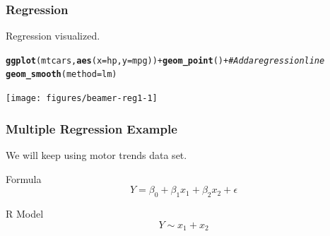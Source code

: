 \documentclass{beamer}\usepackage[]{graphicx}\usepackage[]{color}
\makeatletter
\newcommand{\hlcom}[1]{\textcolor[rgb]{0.678,0.584,0.686}{\textit{#1}}}%
\newcommand{\hlopt}[1]{\textcolor[rgb]{0,0,0}{#1}}%
\newcommand{\hlstd}[1]{\textcolor[rgb]{0.345,0.345,0.345}{#1}}%
\newcommand{\hlkwc}[1]{\textcolor[rgb]{0.333,0.667,0.333}{#1}}%
\newcommand{\hlkwd}[1]{\textcolor[rgb]{0.737,0.353,0.396}{\textbf{#1}}}%
\newenvironment{kframe}{%
 \def\at@end@of@kframe{}%
 \ifinner\ifhmode%
  \def\at@end@of@kframe{\end{minipage}}%
  \begin{minipage}{\columnwidth}%
 \fi\fi%
 \def\FrameCommand##1{\hskip\@totalleftmargin \hskip-\fboxsep
 \colorbox{shadecolor}{##1}\hskip-\fboxsep
     \hskip-\linewidth \hskip-\@totalleftmargin \hskip\columnwidth}%
 \MakeFramed {\advance\hsize-\width
   \@totalleftmargin\z@ \linewidth\hsize
   \@setminipage}}%
 {\par\unskip\endMakeFramed%
 \at@end@of@kframe}
\newenvironment{knitrout}{}{} %
\makeatother
\begin{document}
\begin{frame}
\frametitle{Regression}

Regression visualized.

\begin{knitrout}\scriptsize
{}\color{fgcolor}\begin{kframe}
\begin{alltt}
\hlkwd{ggplot}\hlstd{(mtcars,} \hlkwd{aes}\hlstd{(}\hlkwc{x} \hlstd{= hp,} \hlkwc{y} \hlstd{= mpg))} \hlopt{+} \hlkwd{geom_point}\hlstd{()} \hlopt{+} \hlcom{# Add a regression line}
\hlkwd{geom_smooth}\hlstd{(}\hlkwc{method} \hlstd{= lm)}
\end{alltt}
\end{kframe}

{\centering \texttt{[image: figures/beamer-reg1-1]} 

}



\end{knitrout}


\end{frame}



\begin{frame}
\frametitle{Multiple Regression Example}

We will keep using motor trends data set.\vfill

\begin{alertblock}{Formula}
	\[
		Y = \beta_0 + \beta_1 x_1 + \beta_2 x_2 + \epsilon
	\]
\end{alertblock}
\vfill
\begin{alertblock}{R Model}
    \[
		Y \sim x_1 + x_2
	\]
\end{alertblock}
\vfill


\end{frame}
\end{document}
